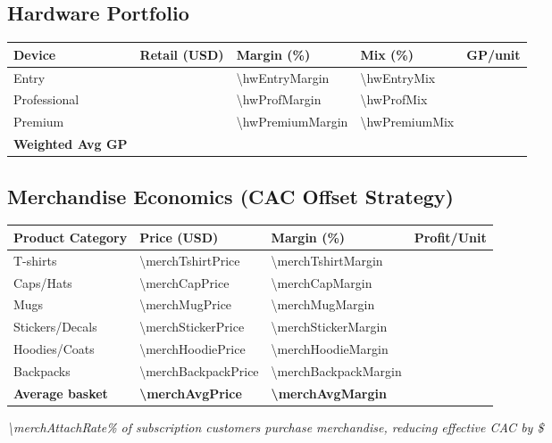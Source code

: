 \subsection{Hardware Portfolio}
\begin{table}[H]
\centering
\begin{tabularx}{\linewidth}{l Y Y Y Y}
\toprule
Device & Retail (USD) & Margin (\%)\cite{industrybenchmark2024} & Mix (\%) & GP/unit \\\midrule
Entry        & \numint{\hwEntryPrice}  & \num{\hwEntryMargin} & \num{\hwEntryMix} &  \\
Professional & \numint{\hwProfPrice} & \num{\hwProfMargin} & \num{\hwProfMix} &  \\
Premium      & \numint{\hwPremiumPrice} & \num{\hwPremiumMargin} & \num{\hwPremiumMix} &  \\\midrule
\textbf{Weighted Avg GP} &  &  &  & \textbf{\numint{\hwWeightedAvgGP}} \\
\bottomrule
\end{tabularx}
\end{table}

\subsection{Merchandise Economics (CAC Offset Strategy)}
\begin{table}[H]
\centering
\begin{tabularx}{\linewidth}{l Y Y Y}
\toprule
Product Category & Price (USD) & Margin (\%)\cite{printful2023} & Profit/Unit \\\midrule
T-shirts & \num{\merchTshirtPrice} & \num{\merchTshirtMargin} &  \\
Caps/Hats & \num{\merchCapPrice} & \num{\merchCapMargin} &  \\
Mugs & \num{\merchMugPrice} & \num{\merchMugMargin} &  \\
Stickers/Decals & \num{\merchStickerPrice} & \num{\merchStickerMargin} &  \\
Hoodies/Coats & \num{\merchHoodiePrice} & \num{\merchHoodieMargin} &  \\
Backpacks & \num{\merchBackpackPrice} & \num{\merchBackpackMargin} &  \\\midrule
\textbf{Average basket} & \textbf{\num{\merchAvgPrice}} & \textbf{\num{\merchAvgMargin}} & \textbf{\numfpeval{\merchAvgProfit}} \\
\bottomrule
\end{tabularx}
\end{table}
\textit{\num{\merchAttachRate}\% of subscription customers purchase merchandise, reducing effective CAC by \$\numfpeval{\merchOffsetSubsCalc}}\cite{shopify2024}
